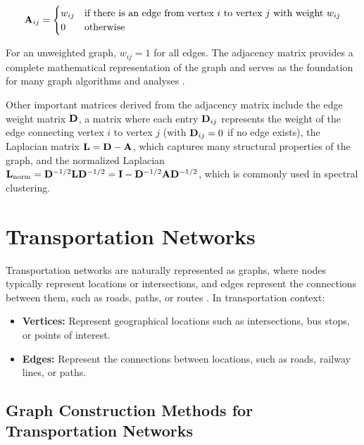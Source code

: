 \begin{equation}
    \mathbf{A}_{ij} = 
    \begin{cases} 
        w_{ij} & \text{if there is an edge from vertex $i$ to vertex $j$ with weight $w_{ij}$} \\
        0 & \text{otherwise}
    \end{cases}
\end{equation}

For an unweighted graph, $w_{ij} = 1$ for all edges. The adjacency matrix provides a complete mathematical representation of the graph and serves as the foundation for many graph algorithms and analyses .

Other important matrices derived from the adjacency matrix include the edge weight matrix $\mathbf{D}$, a matrix where each entry $\mathbf{D}_{ij}$ represents the weight of the edge connecting vertex $i$ to vertex $j$ (with $\mathbf{D}_{ij} = 0$ if no edge exists), the Laplacian matrix $\mathbf{L} = \mathbf{D} - \mathbf{A}$, which captures many structural properties of the graph, and the normalized Laplacian $\mathbf{L}_{\text{norm}} = \mathbf{D}^{-1/2}\mathbf{L}\mathbf{D}^{-1/2} = \mathbf{I} - \mathbf{D}^{-1/2}\mathbf{A}\mathbf{D}^{-1/2}$, which is commonly used in spectral clustering.

\section{Transportation Networks}
\label{se:TransportationNetworks}

Transportation networks are naturally represented as graphs, where nodes typically represent locations or intersections, and edges represent the connections between them, such as roads, paths, or routes . In transportation context:

\begin{itemize}
    \item \textbf{Vertices:} Represent geographical locations such as intersections, bus stops, or points of interest.
    \item \textbf{Edges:} Represent the connections between locations, such as roads, railway lines, or paths.
\end{itemize}

\subsection{Graph Construction Methods for Transportation Networks}
\label{subsec:GraphConstructionMethods}

